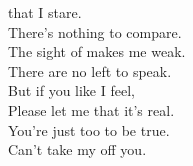   that I stare. \\
\songwordfb{} There's nothing  to compare. \\
\songwordfb{} The sight of  makes me weak. \\
\songwordfb{} There are no  left to speak. \\
\songwordfb{} But if you  like I feel, \\
\songwordfb{} Please let me  that it's real. \\
\songwordfb{} You're just too  to be true. \\
\songwordfb{} Can't take my  off you. \\
\songwordfb{} 